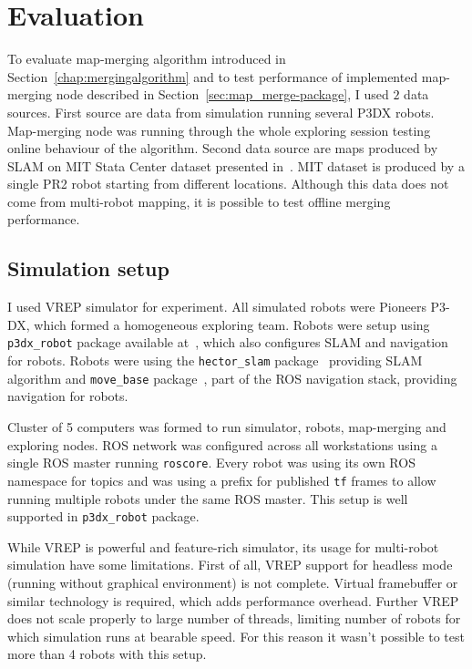 \chapter{Evaluation}
\label{chap:evaluation}

To evaluate map-merging algorithm introduced in Section~\ref{chap:mergingalgorithm} and to test performance of implemented map-merging node described in Section~\ref{sec:map_merge-package}, I used $2$ data sources. First source are data from  simulation running several P3DX robots. Map-merging node was running through the whole exploring session testing online behaviour of the algorithm. Second data source are maps produced by \gls{SLAM} on \gls{MIT} Stata Center dataset presented in~\cite{Fallon2013}. \gls{MIT} dataset is produced by a single PR2 robot starting from different locations. Although this data does not come from multi-robot mapping, it is possible to test offline merging performance.

\section{Simulation setup}

I used \gls{VREP} simulator for experiment. All simulated robots were Pioneers P3-DX, which formed a homogeneous exploring team. Robots were setup using \texttt{p3dx\_robot} package available at~\cite{GitHubRoboRescue}, which also configures \gls{SLAM} and navigation for robots. Robots were using the \texttt{hector\_slam} package~\cite{2013:RoboCup} providing \gls{SLAM} algorithm and \texttt{move\_base} package~\cite{Marder2016}, part of the \gls{ROS} navigation stack, providing navigation for robots.

Cluster of 5 computers was formed to run simulator, robots, map-merging and exploring nodes. \gls{ROS} network was configured across all workstations using a single \gls{ROS} master running \texttt{roscore}. Every robot was using its own \gls{ROS} namespace for topics and was using a prefix for published \texttt{tf} frames to allow running multiple robots under the same \gls{ROS} master. This setup is well supported in \texttt{p3dx\_robot} package.

While \gls{VREP} is powerful and feature-rich simulator, its usage for multi-robot simulation have some limitations. First of all, \gls{VREP} support for headless mode (running without graphical environment) is not complete. Virtual framebuffer or similar technology is required, which adds performance overhead. Further \gls{VREP} does not scale properly to large number of threads, limiting number of robots for which simulation runs at bearable speed. For this reason it wasn't possible  to test more than 4 robots with this setup.

